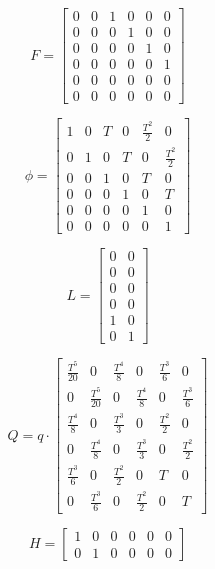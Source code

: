 \documentclass[9pt]{IEEEtran}
\begin{document}
\begin{equation}
    F = \begin{bmatrix}
    0 & 0 & 1 & 0 & 0 & 0 \\
    0 & 0 & 0 & 1 & 0 & 0 \\
    0 & 0 & 0 & 0 & 1 & 0 \\
    0 & 0 & 0 & 0 & 0 & 1 \\
    0 & 0 & 0 & 0 & 0 & 0 \\
    0 & 0 & 0 & 0 & 0 & 0
    \end{bmatrix}
\end{equation}

\begin{equation}
    \phi = \begin{bmatrix}
    1 & 0 & T & 0 & \frac{T^2}{2} & 0 \\
    0 & 1 & 0 & T & 0 & \frac{T^2}{2} \\
    0 & 0 & 1 & 0 & T & 0 \\
    0 & 0 & 0 & 1 & 0 & T \\
    0 & 0 & 0 & 0 & 1 & 0 \\
    0 & 0 & 0 & 0 & 0 & 1
    \end{bmatrix}
\end{equation}

\begin{equation}
    L = \begin{bmatrix}
    0 & 0 \\
    0 & 0 \\
    0 & 0 \\
    0 & 0 \\
    1 & 0 \\
    0 & 1
    \end{bmatrix}
\end{equation}
    
\begin{equation}
    Q = q \cdot \begin{bmatrix}
    \frac{ T^5}{20} & 0 & \frac{ T^4}{8} & 0 & \frac{ T^3}{6} & 0 \\
    0 & \frac{T^5}{20} & 0 & \frac{T^4}{8} & 0 & \frac{T^3}{6} \\
    \frac{T^4}{8} & 0 & \frac{T^3}{3} & 0 & \frac{T^2}{2} & 0 \\
    0 & \frac{ T^4}{8} & 0 & \frac{T^3}{3} & 0 & \frac{ T^2}{2} \\
    \frac{T^3}{6} & 0 & \frac{T^2}{2} & 0 & T & 0 \\
    0 & \frac{T^3}{6} & 0 & \frac{T^2}{2} & 0 & T
    \end{bmatrix}
\end{equation}

\begin{equation}
    H = \begin{bmatrix}
    1 & 0 & 0 & 0 & 0 & 0 \\
    0 & 1 & 0 & 0 & 0 & 0
    \end{bmatrix}
\end{equation}
    
        


\end{document}
